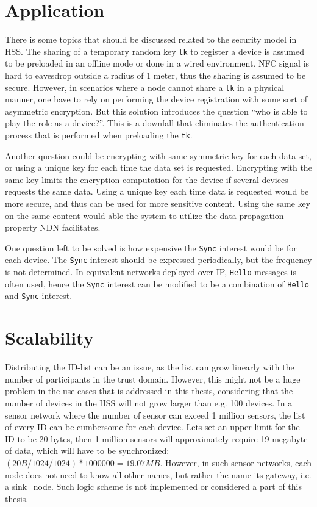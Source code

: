\section{Application}
There is some topics that should be discussed related to the security model in \gls{HSS}.
The sharing of a temporary random key \texttt{tk} to register a device is assumed to be preloaded in an offline mode or done in a wired environment. 
\gls{NFC} signal is hard to eavesdrop outside a radius of 1 meter, thus the sharing is assumed to be secure.
However, in scenarios where a node cannot share a \texttt{tk} in a physical manner, one have to rely on performing the device registration with some sort of asymmetric encryption. 
But this solution introduces the question ``who is able to play the role as a device?''.
This is a downfall that eliminates the authentication process that is performed when preloading the \texttt{tk}.

Another question could be encrypting with same symmetric key for each data set, or using a unique key for each time the data set is requested.
Encrypting with the same key limits the encryption computation for the device if several devices requests the same \gls{data}.
Using a unique key each time \gls{data} is requested would be more secure, and thus can be used for more sensitive content.
Using the same key on the same content would able the system to utilize the data propagation property \gls{NDN} facilitates.

One question left to be solved is how expensive the \texttt{Sync} \gls{interest} would be for each device. 
The \texttt{Sync} \gls{interest} should be expressed periodically, but the frequency is not determined. 
In equivalent networks deployed over \gls{IP}, \texttt{Hello} messages is often used, hence the \texttt{Sync} \gls{interest} can be modified to be a combination of \texttt{Hello} and \texttt{Sync} \gls{interest}.

\section{Scalability}
Distributing the \gls{ID}-list can be an issue, as the list can grow linearly with the number of participants in the trust domain.
However, this might not be a huge problem in the use cases that is addressed in this thesis, considering that the number of devices in the \gls{HSS} will not grow larger than e.g. 100 devices. 
In a sensor network where the number of sensor can exceed 1 million sensors, the list of every ID can be cumbersome for each device.
Lets set an upper limit for the ID to be 20 bytes, then 1 million sensors will approximately require 19 megabyte of data, which will have to be synchronized:
$(20B / 1024 / 1024) * 1 000 000 = 19.07MB$.
However, in such sensor networks, each node does not need to know all other names, but rather the name its gateway, i.e. a \gls{sink_node}. 
Such logic scheme is not implemented or considered a part of this thesis.

